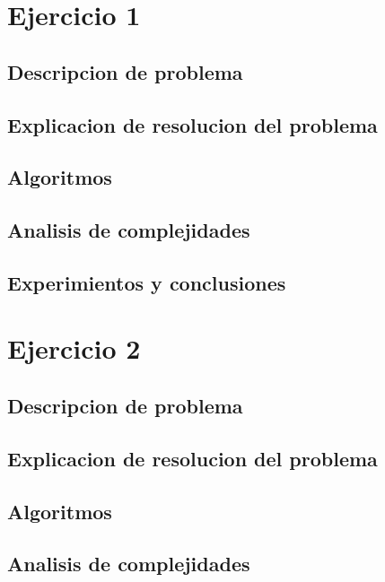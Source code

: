 \documentclass[12pt, a4paper]{article}
\begin{document}
\maketitle
\tableofcontents
\newpage

\section{Ejercicio 1} 
\subsection{Descripcion de problema}

\subsection{Explicacion de resolucion del problema}

\subsection{Algoritmos}

\subsection{Analisis de complejidades}

\subsection{Experimientos y conclusiones}


\section{Ejercicio 2} 
\subsection{Descripcion de problema}

\subsection{Explicacion de resolucion del problema}

\subsection{Algoritmos}

\subsection{Analisis de complejidades}

\end{document}
